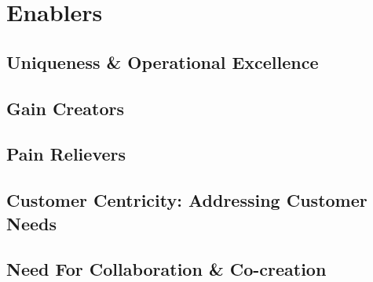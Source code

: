 \section{Enablers}
\label{sec:enablers}

\subsection{Uniqueness \& Operational Excellence}

\subsection{Gain Creators}

\subsection{Pain Relievers}

\subsection{Customer Centricity: Addressing Customer Needs}

\subsection{Need For Collaboration \& Co-creation}
